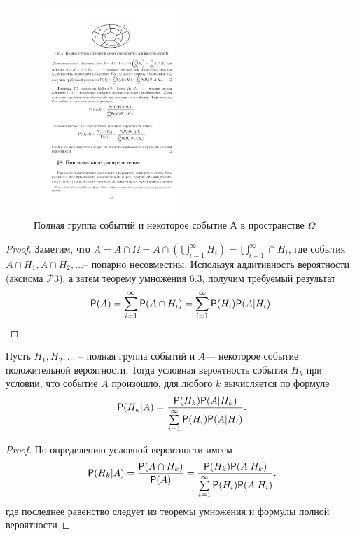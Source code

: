 \begin{figure}[H]
	\centering
	\includegraphics[width=0.5\textwidth]{pic/pic7.pdf}
	\caption{Полная группа событий и некоторое событие А в пространстве $\Omega$}
	\label{pic:7}
\end{figure}


\begin{proof}
	Заметим, что $A=A\cap\Omega=A\cap\left(\bigcup\limits^{\infty}_{i=1}H_i\right)=\bigcup\limits_{i=1}^{\infty}\cap H_i$, где события $A\cap H_1,A\cap H_2,\dots$-- попарно несовместны. Используя аддитивность вероятности (аксиома $\mathcal{P}3$), а затем теорему умножения 6.3, получим требуемый результат
	\begin{equation*}
		\P(A)=\sum\limits_{i=1}^{\infty}\P(A\cap H_i)=
		\sum\limits_{i=1}^{\infty}\P(H_i)\P(A|H_i).
	\end{equation*}
\end{proof}

\begin{theorem}
\label{th:7.2}
Пусть $H_1,H_2,\dots$ – полная группа
событий и $A $— некоторое событие положительной вероятности. Тогда
условная вероятность события $H_k$ при условии, что событие $A$ произошло,
для любого $k$ вычисляется по формуле
\begin{equation*}
	\P(H_k|A)=\frac{\P(H_k)\P(A|H_k)}{\sum\limits_{i=1}^{\infty}\P(H_i)\P(A|H_i)}.
\end{equation*}
\end{theorem}

\begin{proof}
	По определению условной вероятности имеем
	\begin{equation*}
		\P(H_k|A)=\frac{\P(A\cap H_k)}{\P(A)}=\frac{\P(H_k)\P(A|H_k)}
		{\sum\limits_{i=1}^{\infty}\P(H_i)\P(A|H_i)}.
	\end{equation*}
где последнее равенство следует из теоремы умножения и формулы полной
вероятности
\end{proof}